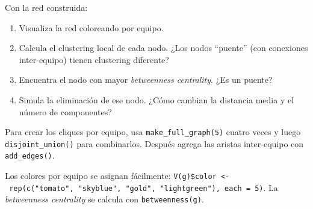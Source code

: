 \documentclass[
  letterpaper,
  DIV=11,
  numbers=noendperiod]{scrreprt}
\providecommand{\tightlist}{%
  \setlength{\itemsep}{0pt}\setlength{\parskip}{0pt}}
\begin{document}
Con la red construida:

\begin{enumerate}
\def\labelenumi{\alph{enumi})}
\tightlist
\item
  Visualiza la red coloreando por equipo.
\item
  Calcula el clustering local de cada nodo. ¿Los nodos ``puente'' (con
  conexiones inter-equipo) tienen clustering diferente?
\item
  Encuentra el nodo con mayor \emph{betweenness centrality}. ¿Es un
  puente?
\item
  Simula la eliminación de ese nodo. ¿Cómo cambian la distancia media y
  el número de componentes?
\end{enumerate}

\begin{tcolorbox}[enhanced jigsaw, toprule=.15mm, colframe=quarto-callout-note-color-frame, coltitle=black, titlerule=0mm, colback=white, breakable, leftrule=.75mm, arc=.35mm, bottomtitle=1mm, toptitle=1mm, rightrule=.15mm, bottomrule=.15mm, left=2mm, title=\textcolor{quarto-callout-note-color}{\faInfo}\hspace{0.5em}{💡 Pista 1}, colbacktitle=quarto-callout-note-color!10!white, opacityback=0, opacitybacktitle=0.6]

Para crear los cliques por equipo, usa \texttt{make\_full\_graph(5)}
cuatro veces y luego \texttt{disjoint\_union()} para combinarlos.
Después agrega las aristas inter-equipo con \texttt{add\_edges()}.

\end{tcolorbox}

\begin{tcolorbox}[enhanced jigsaw, toprule=.15mm, colframe=quarto-callout-note-color-frame, coltitle=black, titlerule=0mm, colback=white, breakable, leftrule=.75mm, arc=.35mm, bottomtitle=1mm, toptitle=1mm, rightrule=.15mm, bottomrule=.15mm, left=2mm, title=\textcolor{quarto-callout-note-color}{\faInfo}\hspace{0.5em}{💡 Pista 2}, colbacktitle=quarto-callout-note-color!10!white, opacityback=0, opacitybacktitle=0.6]

Los colores por equipo se asignan fácilmente:
\texttt{V(g)\$color\ \textless{}-\ rep(c("tomato",\ "skyblue",\ "gold",\ "lightgreen"),\ each\ =\ 5)}.
La \emph{betweenness centrality} se calcula con \texttt{betweenness(g)}.

\end{tcolorbox}
\end{document}
